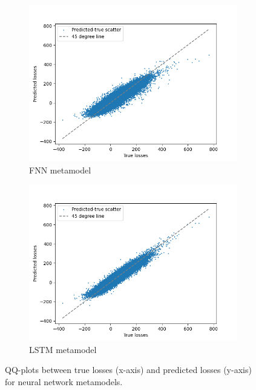 \begin{figure}[ht!]
    \centering
    \begin{subfigure}{0.48\textwidth}
        \includegraphics[width=\textwidth]{./project2/figures/qqPlots/fnnLN.png}
        \caption{FNN metamodel}
    \end{subfigure}\hfill
    \begin{subfigure}{0.48\textwidth}
        \includegraphics[width=\textwidth]{./project2/figures/qqPlots/lstmLoCapLN.png}
        \caption{LSTM metamodel}
    \end{subfigure}
    \caption{QQ-plots between true losses (x-axis) and predicted losses (y-axis) for neural network metamodels.} 
    \label{fig2:QQ_NN}
\end{figure}

